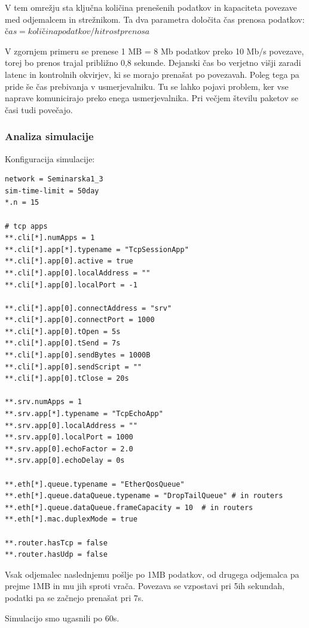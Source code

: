 \documentclass[11pt,a4paper,slovene]{myarticle}
\begin{document}
V tem omrežju sta ključna količina prenešenih podatkov in kapaciteta povezave med odjemalcem in strežnikom. Ta dva parametra določita čas prenosa podatkov:
$čas = količina podatkov / hitrost prenosa$

V zgornjem primeru se prenese 1 MB = 8 Mb podatkov preko 10 Mb/s povezave, torej bo prenos trajal približno 0,8 sekunde. Dejanski čas bo verjetno višji zaradi latenc in kontrolnih okvirjev, ki se morajo prenašat po povezavah.
Poleg tega pa pride še čas prebivanja v usmerjevalniku. Tu se lahko pojavi problem, ker vse naprave komunicirajo preko enega usmerjevalnika.
Pri večjem številu paketov se časi tudi povečajo.


\subsubsection{Analiza simulacije}

Konfiguracija simulacije:

\begin{lstlisting}
network = Seminarska1_3
sim-time-limit = 50day
*.n = 15

# tcp apps
**.cli[*].numApps = 1
**.cli[*].app[*].typename = "TcpSessionApp"
**.cli[*].app[0].active = true
**.cli[*].app[0].localAddress = ""
**.cli[*].app[0].localPort = -1

**.cli[*].app[0].connectAddress = "srv"
**.cli[*].app[0].connectPort = 1000
**.cli[*].app[0].tOpen = 5s
**.cli[*].app[0].tSend = 7s
**.cli[*].app[0].sendBytes = 1000B
**.cli[*].app[0].sendScript = ""
**.cli[*].app[0].tClose = 20s

**.srv.numApps = 1
**.srv.app[*].typename = "TcpEchoApp"
**.srv.app[0].localAddress = ""
**.srv.app[0].localPort = 1000
**.srv.app[0].echoFactor = 2.0
**.srv.app[0].echoDelay = 0s

**.eth[*].queue.typename = "EtherQosQueue"
**.eth[*].queue.dataQueue.typename = "DropTailQueue" # in routers
**.eth[*].queue.dataQueue.frameCapacity = 10  # in routers
**.eth[*].mac.duplexMode = true

**.router.hasTcp = false
**.router.hasUdp = false

\end{lstlisting}

Vsak odjemalec naslednjemu pošlje po 1MB podatkov, od drugega odjemalca pa prejme 1MB in mu jih sproti vrača. Povezava se vzpostavi pri 5ih sekundah, podatki pa se začnejo prenašat pri 7s.

Simulacijo smo ugasnili po 60s.
\end{document}
